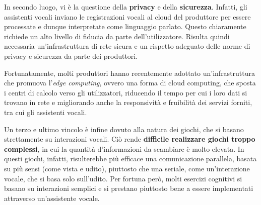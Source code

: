 In secondo luogo, vi è la questione della \textbf{privacy} e della
\textbf{sicurezza}. Infatti, gli assistenti vocali inviano le registrazioni
vocali al cloud del produttore per essere processate e dunque interpretate come
linguaggio parlato. Questo chiaramente richiede un alto livello di fiducia da
parte dell’utilizzatore. Risulta quindi necessaria un’infrastruttura di rete
sicura e un rispetto adeguato delle norme di privacy e sicurezza da parte dei
produttori.

Fortunatamente, molti produttori hanno recentemente adottato un’infrastruttura
che promuova l’\textit{edge computing}, ovvero una forma di cloud computing,
che sposta i centri di calcolo verso gli utilizzatori, riducendo il tempo per
cui i loro dati si trovano in rete e migliorando anche la responsività e
fruibilità dei servizi forniti, tra cui gli assistenti vocali.

Un terzo e ultimo vincolo è infine dovuto alla natura dei giochi, che si basano
strettamente su interazioni vocali. Ciò rende \textbf{difficile realizzare
giochi troppo complessi}, in cui la quantità d'informazioni da scambiare è
molto elevata. In questi giochi, infatti, risulterebbe più efficace una
comunicazione parallela, basata su più sensi (come vista e udito), piuttosto
che una seriale, come un’interazione vocale, che si basa solo sull’udito. Per
fortuna però, molti esercizi cognitivi si basano su interazioni semplici e si
prestano piuttosto bene a essere implementati attraverso un’assistente vocale.
